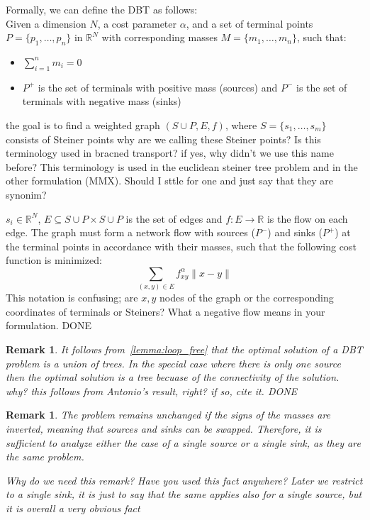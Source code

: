 \documentclass[11pt,reqno,a4paper]{amsart}
\numberwithin{equation}{section}
\theoremstyle{mytheorem}
\theoremstyle{myremark}
\newtheorem{remark}[subsection]{Remark}
\theoremstyle{myparagraph}
\newcommand{\R}{\mathbb{R}}
\begin{document}
    Formally, we can define the DBT as follows: \\
    Given a dimension $N$, a cost parameter $\alpha$, and a set of terminal points $P = \{p_1, \ldots, p_n\}$ in $\mathbb{R}^N$ with
    corresponding masses $M = \{m_1, \ldots, m_n\}$, such that:
    \begin{itemize}
        \item $\sum_{i=1}^{n} m_i = 0$
        \item $P^+$ is the set of terminals with positive mass (sources) and $P^-$ is the set of terminals with negative mass (sinks)
    \end{itemize}

    the goal is to find a weighted graph $(S \cup P, E, f)$, where $S = \{s_1, \ldots, s_m\}$
    consists of Steiner points
        {\color{red} why are we calling these Steiner points? Is this terminology used in bracned transport? if yes, why didn't we use this name before?
    This terminology is used in the euclidean steiner tree problem and in the other formulation (MMX). Should I sttle for one and just say that they are synonim?
    }

    $s_i \in \R^N$, $E \subseteq S \cup P \times S \cup P$ is the set of edges and
    $f : E \rightarrow \mathbb{R}$ is the flow on each edge.
    The graph must form a network flow with sources ($P^-$) and sinks ($P^+$) at the terminal points in accordance with their masses,
    such that the following cost function is minimized:
    \[
        \sum_{(x,y) \in E} f_{xy}^\alpha \|x - y\|
    \]
        {\color{red} This notation is confusing; are $x,y$ nodes of the graph or the corresponding coordinates of terminals or Steiners?}
        {\color{red} What a negative flow means in your formulation. DONE}
    \begin{remark}
        It follows from~\ref{lemma:loop_free} that the optimal solution of a DBT problem is a union of trees.
        In the special case where there is only one source then the optimal solution is a tree becuase of the connectivity
        of the solution.
            {\color{red} why? this follows from Antonio's result, right? if so, cite it. DONE}
    \end{remark}
    \begin{remark}

        The problem remains unchanged if the signs of the masses are inverted, meaning that sources and sinks can be swapped.
        Therefore, it is sufficient to analyze either the case of a single source or a single sink, as they are the same problem.

            {\color{red} Why do we need this remark? Have you used this fact anywhere? Later we restrict to a single sink,
        it is just to say that the same applies also for a single source, but it is overall a very obvious fact}
    \end{remark}
\end{document}
